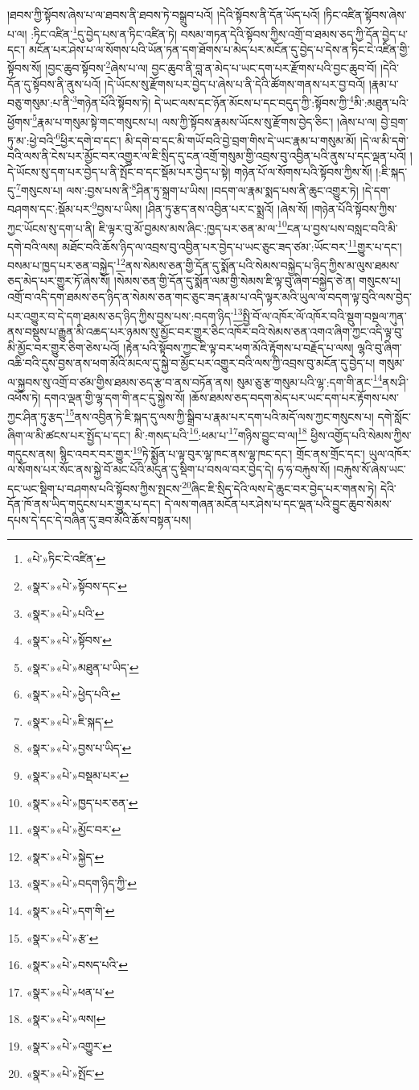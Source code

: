 །ཐབས་ཀྱི་སྟོབས་ཞེས་པ་ལ་ཐབས་ནི་ཐབས་ཏེ་བསྒྲུབ་པའོ། །དེའི་སྟོབས་ནི་དོན་ཡོད་པའོ། །ཏིང་འཛིན་སྟོབས་ཞེས་པ་ལ། :ཏིང་འཛིན་\footnote{«པེ་»ཏིང་ངེ་འཛིན་}དུ་བྱེད་པས་ན་ཏིང་འཛིན་ཏེ། བསམ་གཏན་དེའི་སྟོབས་ཀྱིས་འགྲོ་བ་ཐམས་ཅད་ཀྱི་དོན་བྱེད་པ་དང་། མངོན་པར་ཤེས་པ་ལ་སོགས་པའི་ཡོན་ཏན་དག་ཐོགས་པ་མེད་པར་མངོན་དུ་བྱེད་པ་དེས་ན་ཏིང་ངེ་འཛིན་གྱི་སྟོབས་སོ། །བྱང་ཆུབ་སྟོབས་\footnote{«སྣར་»«པེ་»སྟོབས་དང་}ཞེས་པ་ལ། བྱང་ཆུབ་ནི་བླ་ན་མེད་པ་ཡང་དག་པར་རྫོགས་པའི་བྱང་ཆུབ་བོ། །དེའི་དོན་དུ་སྟོབས་ནི་ནུས་པའོ། །དེ་ཡོངས་སུ་རྫོགས་པར་བྱེད་པ་ཞེས་པ་ནི་དེའི་ཚོགས་གནས་པར་བྱ་བའོ། །རྣམ་པ་བཅུ་གསུམ་:པ་ནི་\footnote{«སྣར་»«པེ་»པའི་}གཉེན་པོའི་སྟོབས་ཏེ། དེ་ཡང་ལས་དང་ཉོན་མོངས་པ་དང་བདུད་ཀྱི་:སྟོབས་ཀྱི་\footnote{«སྣར་»«པེ་»སྟོབས་}མི་:མཐུན་པའི་ཕྱོགས་\footnote{«སྣར་»«པེ་»མཐུན་པ་ཡིད་}རྣམ་པ་གསུམ་སྟེ་གང་གསུངས་པ། ལས་ཀྱི་སྟོབས་རྣམས་ཡོངས་སུ་རྫོགས་བྱེད་ཅིང་། །ཞེས་པ་ལ། བྱེ་བྲག་ཏུ་མ་:ཕྱེ་བའི་\footnote{«སྣར་»«པེ་»ཕྱེད་པའི་}ཕྱིར་དགེ་བ་དང་། མི་དགེ་བ་དང་མི་གཡོ་བའི་བྱེ་བྲག་གིས་དེ་ཡང་རྣམ་པ་གསུམ་མོ། །དེ་ལ་མི་དགེ་བའི་ལས་ནི་ངེས་པར་མྱོང་བར་འགྱུར་ལ་ཇི་སྲིད་དུ་ངན་འགྲོ་གསུམ་གྱི་འབྲས་བུ་འབྱིན་པའི་ནུས་པ་དང་ལྡན་པའོ། །དེ་ཡོངས་སུ་དག་པར་བྱེད་པ་ནི་སྤོང་བ་དང་སྡོམ་པར་བྱེད་པ་སྟེ། གཉེན་པོ་ལ་སོགས་པའི་སྟོབས་ཀྱིས་སོ། །:ཇི་སྐད་དུ་\footnote{«སྣར་»«པེ་»ཇི་སྐད་}གསུངས་པ། ལས་:བྱས་པས་ནི་\footnote{«སྣར་»«པེ་»བྱས་པ་ཡིད་}ཤིན་ཏུ་སྐྲག་པ་ཡིས། །བདག་ལ་རྣམ་སྨད་པས་ནི་ཆུང་འགྱུར་ཏེ། །དེ་དག་བཤགས་དང་:སྡོམ་པར་\footnote{«སྣར་»«པེ་»བསྡམ་པར་}བྱས་པ་ཡིས། །ཤིན་ཏུ་རྩད་ནས་འབྱིན་པར་ང་སྨྲའོ། །ཞེས་སོ། །གཉེན་པོའི་སྟོབས་ཀྱིས་ཀྱང་ཡོངས་སུ་དག་པ་ནི། ཇི་ལྟར་བུ་མོ་བྱམས་མས་ཞིང་:ཁྱད་པར་ཅན་མ་ལ་\footnote{«སྣར་»«པེ་»ཁྱད་པར་ཅན་}ངན་པ་བྱས་པས་བསླང་བའི་མི་དགེ་བའི་ལས། མཐོང་བའི་ཆོས་ཉིད་ལ་འབྲས་བུ་འབྱིན་པར་བྱེད་པ་ཡང་ཅུང་ཟད་ཙམ་:ཡོང་བར་\footnote{«སྣར་»«པེ་»མྱོང་བར་}གྱུར་པ་དང་། བསམ་པ་ཁྱད་པར་ཅན་བསྐྱེད་\footnote{«སྣར་»«པེ་»སྐྱེད་}ནས་སེམས་ཅན་གྱི་དོན་དུ་སྨོན་པའི་སེམས་བསྐྱེད་པ་ཉིད་ཀྱིས་མ་ལུས་ཐམས་ཅད་མེད་པར་གྱུར་ཏོ་ཞེས་སོ། །སེམས་ཅན་གྱི་དོན་དུ་སྨོན་ལམ་གྱི་སེམས་ཇི་ལྟ་བུ་ཞིག་བསྐྱེད་ཅེ་ན། གསུངས་པ། འགྲོ་བ་འདི་དག་ཐམས་ཅད་ཉིད་ན་སེམས་ཅན་གང་ཅུང་ཟད་རྣམ་པ་འདི་ལྟར་མའི་ཡུལ་ལ་བདག་ལྟ་བུའི་ལས་བྱེད་པར་འགྱུར་བ་དེ་དག་ཐམས་ཅད་ཉིད་ཀྱིས་བྱས་པས་:བདག་ཉིད་\footnote{«སྣར་»«པེ་»བདག་ཉིད་ཀྱི་}སྤྱི་བོ་ལ་འཁོར་ལོ་འཁོར་བའི་སྡུག་བསྔལ་ཀུན་ནས་བསྡུས་པ་རྒྱུན་མི་འཆད་པར་ཉམས་སུ་མྱོང་བར་གྱུར་ཅིང་འཁོར་བའི་སེམས་ཅན་འགའ་ཞིག་ཀྱང་འདི་ལྟ་བུ་མི་མྱོང་བར་གྱུར་ཅིག་ཅེས་པའོ། །རྟེན་པའི་སྟོབས་ཀྱང་ཇི་ལྟ་བར་ཕག་མོའི་རྟོགས་པ་བརྗོད་པ་ལས། ལྷའི་བུ་ཞིག་འཆི་བའི་དུས་བྱས་ནས་ཕག་མོའི་མངལ་དུ་སྐྱེ་བ་མྱོང་པར་འགྱུར་བའི་ལས་ཀྱི་འབྲས་བུ་མངོན་དུ་བྱེད་པ། གསུམ་ལ་སྐྱབས་སུ་འགྲོ་བ་ཙམ་གྱིས་ཐམས་ཅད་རྩ་བ་ནས་བཏོན་ནས། སུམ་ཅུ་རྩ་གསུམ་པའི་ལྷ་:དག་གི་ནང་\footnote{«སྣར་»«པེ་»དག་གི་}ནས་ཤི་འཕོས་ཏེ། དགའ་ལྡན་གྱི་ལྷ་དག་གི་ནང་དུ་སྐྱེས་སོ། །ཆོས་ཐམས་ཅད་བདག་མེད་པར་ཡང་དག་པར་རྟོགས་པས་ཀྱང་ཤིན་ཏུ་རྩད་\footnote{«སྣར་»«པེ་»རྩ་}ནས་འབྱིན་ཏེ་ཇི་སྐད་དུ་ལས་ཀྱི་སྒྲིབ་པ་རྣམ་པར་དག་པའི་མདོ་ལས་ཀྱང་གསུངས་པ། དགེ་སློང་ཞིག་ལ་མི་ཚངས་པར་སྤྱོད་པ་དང་། མི་:གསད་པའི་\footnote{«སྣར་»«པེ་»བསད་པའི་}:ཕམ་པ་\footnote{«སྣར་»«པེ་»ཕན་པ་}གཉིས་བྱུང་བ་ལ།\footnote{«སྣར་»«པེ་»ལས།} ཕྱིས་འགྱོད་པའི་སེམས་ཀྱིས་གདུངས་ནས། སྙིང་འབར་བར་གྱུར་\footnote{«སྣར་»«པེ་»འགྱུར་}ཏེ་སྨྱོན་པ་ལྟ་བུར་ལྷ་ཁང་ནས་ལྷ་ཁང་དང་། གྲོང་ནས་གྲོང་དང་། ཡུལ་འཁོར་ལ་སོགས་པར་སོང་ནས་སྐྱེ་བོ་མང་པོའི་མདུན་དུ་སྡིག་པ་བསལ་བར་བྱེད་དེ། ཧ་ཧ་བརྐུས་སོ། །བརྐུས་སོ་ཞེས་ཡང་དང་ཡང་སྡིག་པ་བཤགས་པའི་སྟོབས་ཀྱིས་སྤངས་\footnote{«སྣར་»«པེ་»སྤོང་}ཞིང་ཇི་སྲིད་དེའི་ལས་དེ་ཆུང་བར་བྱེད་པར་གནས་ཏེ། དེའི་དོན་ཁོ་ནས་ཡིད་གདུངས་པར་གྱུར་པ་དང་། དེ་ལས་གཞན་མངོན་པར་ཤེས་པ་དང་ལྡན་པའི་བྱུང་ཆུབ་སེམས་དཔས་དེ་དང་དེ་བཞིན་དུ་ཟབ་མོའི་ཆོས་བསྟན་པས། 